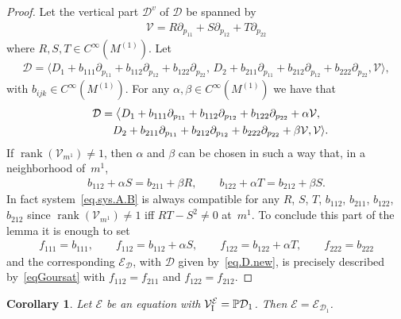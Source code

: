\documentclass[pdftex]{sigma}
\newcommand{\D}{\mathcal{D}}
\newcommand{\MM}{\mathcal{V}_{\textrm{\normalfont I}}}
\newcommand{\E}{\mathcal{E}}
\renewcommand{\P}{\mathbb{P}}
\newcommand{\rank}{\operatorname{rank}}
\numberwithin{equation}{section}
\newtheorem{Corollary}[Theorem]{Corollary}
\begin{document}
\begin{proof}
Let the vertical part $\mathcal{D}^v$ of $\mathcal{D}$ be spanned by
\begin{gather*}
\mathcal{V}=R\partial_{p_{11}}+S\partial_{p_{12}}+T\partial_{p_{22}}
\end{gather*}
where $R,S,T\in C^\infty(M^{(1)})$. Let
\begin{gather*}
\mathcal{D}=
\langle D_1 + b_{111}\partial_{p_{11}} + b_{112}\partial_{p_{12}} + b_{122}\partial_{p_{22}},\,
D_2 + b_{211}\partial_{p_{11}} + b_{212}\partial_{p_{12}} + b_{222}\partial_{p_{22}},
\mathcal{V} \rangle,
\end{gather*}
with $b_{ijk}\in C^\infty(M^{(1)})$. For any $\alpha,\beta\in C^\infty(M^{(1)})$ we have that
\begin{gather}
\D =\big\langle D_1 + b_{111}\partial_{p_{11}} + b_{112}\partial_{p_{12}} + b_{122}\partial_{p_{22}}
+ \alpha \mathcal{V},\nonumber\\
\hphantom{\D =\big\langle}{}
D_2 + b_{211}\partial_{p_{11}} + b_{212}\partial_{p_{12}} + b_{222}\partial_{p_{22}}
+ \beta \mathcal{V} ,
\mathcal{V} \rangle.\label{eq.D.new}
\end{gather}
If $\rank(\mathcal{V}_{m^1})\neq 1$, then $\alpha$ and $\beta$ can be chosen in such a way that, in a neighborhood of~$m^1$,
\begin{gather}\label{eq.sys.A.B}
b_{112}+\alpha S=b_{211}+\beta R , \qquad b_{122}+\alpha T=b_{212}+\beta S.
\end{gather}
In fact system~\eqref{eq.sys.A.B} is always compatible for any
$R$, $S$, $T$, $b_{112}$, $b_{211}$, $b_{122}$, $b_{212}$ since \mbox{$\rank(\mathcal{V}_{m^1}){\neq} 1$} if\/f $RT-S^2\neq 0$ at~$m^1$. To conclude this part of the lemma it is enough to set
\begin{gather*}
f_{111}=b_{111} , \qquad f_{112}=b_{112}+\alpha S, \qquad f_{122}=b_{122}+\alpha T, \qquad f_{222}=b_{222}
\end{gather*}
and the corresponding $\E_{\D}$, with $\D$ given by~\eqref{eq.D.new}, is precisely described by~\eqref{eqGoursat} with $f_{112}=f_{211}$ and $f_{122}=f_{212}$.
\end{proof}

\begin{Corollary}\label{CorollarioCheSeFunzionaSarebbeCarino}
 Let $\E$ be an equation with $\MM^\E=\P\D_1$. Then $\E=\E_{\D_1}$.
\end{Corollary}
\end{document}
